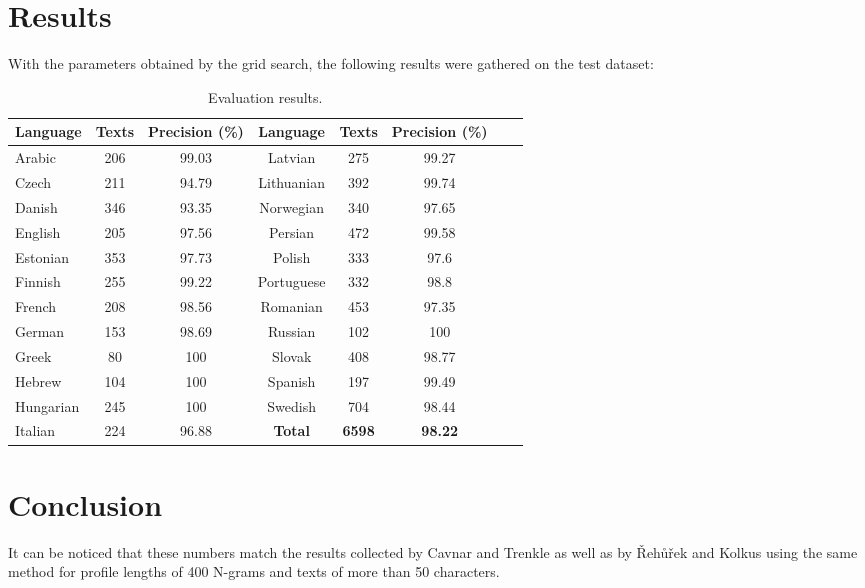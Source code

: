 \documentclass{llncs}
\begin{document}
\section{Results}

With the parameters obtained by the grid search, the following results were gathered on the test dataset:

\begin{table}[H]
\caption{Evaluation results.}
\begin{center}
\begin{tabular}{l*{6}{c}r}
\hline
\rule{0pt}{12pt}
\textbf{Language} & \textbf{Texts} & \textbf{Precision} (\%) & \textbf{Language} & \textbf{Texts} & \textbf{Precision} (\%)\\[2pt]
\hline\rule{0pt}{12pt}\mbox{}\par\nobreak
Arabic    & 206   & 99.03     & Latvian    & 275   & 99.27     \\
Czech     & 211   & 94.79     & Lithuanian & 392   & 99.74     \\
Danish    & 346   & 93.35     & Norwegian  & 340   & 97.65     \\
English   & 205   & 97.56     & Persian    & 472   & 99.58     \\
Estonian  & 353   & 97.73     & Polish     & 333   & 97.6      \\
Finnish   & 255   & 99.22     & Portuguese & 332   & 98.8      \\
French    & 208   & 98.56     & Romanian   & 453   & 97.35     \\
German    & 153   & 98.69     & Russian    & 102   & 100       \\
Greek     & 80    & 100       & Slovak     & 408   & 98.77     \\
Hebrew    & 104   & 100       & Spanish    & 197   & 99.49     \\
Hungarian & 245   & 100       & Swedish    & 704   & 98.44     \\
Italian   & 224   & 96.88     & \textbf{Total}      & \textbf{6598}  & \textbf{98.22}     \\ [2pt]
\hline
\end{tabular}
\end{center}
\end{table}

\section{Conclusion}
It can be noticed that these numbers match the results collected by Cavnar and Trenkle \cite{n-gram-basedtext} as well as by Řehůřek and Kolkus \cite{rehurek-kolkus} using the same method for profile lengths of 400 N-grams and texts of more than 50 characters.




\end{document}
